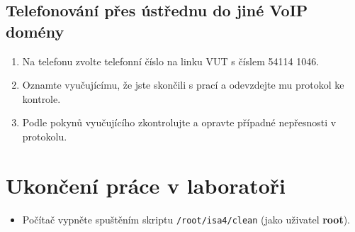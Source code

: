 \subsection{Telefonování přes ústřednu do jiné VoIP domény}
\begin{enumerate}
    \item Na telefonu zvolte telefonní číslo na linku VUT s číslem 54114 1046.
    \item Oznamte vyučujícímu, že jste skončili s prací a odevzdejte mu protokol ke kontrole. 
    \item Podle pokynů vyučujícího zkontrolujte a opravte případné nepřesnosti v protokolu. 
\end{enumerate}

\section{Ukončení práce v laboratoři}
\begin{itemize}
  \item Počítač vypněte spuštěním skriptu {\tt /root/isa4/clean} (jako uživatel {\bf root}).
\end{itemize}
